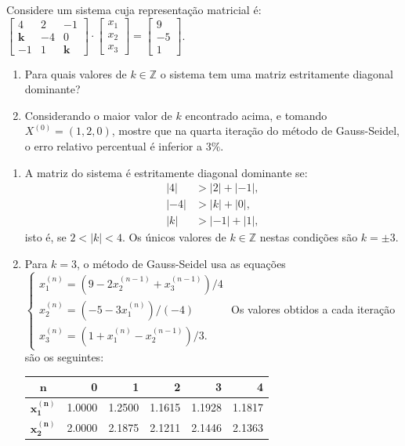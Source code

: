 \documentclass[12pt,a4paper]{article}
\begin{document}
\begin{ExerciseList}
\Exercise[title={2,5}]
Considere um sistema cuja representação matricial é:
$
\begin{bmatrix}
 4 &  2 & -1 \\
\mathbf{k} & -4 &  0 \\
-1 &  1 &  \mathbf{k}
\end{bmatrix}
\cdot
\begin{bmatrix}
x_1 \\ x_2 \\ x_3
\end{bmatrix}
=
\begin{bmatrix}
9 \\ -5 \\ 1
\end{bmatrix}
$.
\begin{enumerate}
\item Para quais valores de $k \in \mathbb{Z}$ o sistema tem uma matriz estritamente diagonal dominante?
\item Considerando o maior valor de $k$ encontrado acima, e tomando$X^{(0)} = (1, 2, 0)$, mostre que na quarta iteração do método de Gauss-Seidel, o erro relativo percentual é inferior a $3\%$.
\end{enumerate}
\Answer
\begin{enumerate}
\item  A matriz do sistema é estritamente diagonal dominante se:
\begin{align*}
|4|  & > |2|  + |-1|,\\
|-4| & > |k|  + |0|,\\
|k|  & > |-1| + |1|,
\end{align*}
isto é, se $2 < |k| < 4$. Os únicos valores de $k \in \mathbb{Z}$ nestas condições são $k = \pm 3$.
\item Para $k=3$, o método de Gauss-Seidel usa as equações $
\begin{cases}
x_1^{(n)} = ( 9 - 2x_2^{(n-1)} + x_3^{(n-1)})/4\\
x_2^{(n)} = (-5 - 3x_1^{(n)})/(-4)\\
x_3^{(n)} = ( 1 +  x_1^{(n)} - x_2^{(n-1)})/3.
\end{cases}
$
Os valores obtidos a cada iteração são os seguintes:
\begin{center}
\begin{tabular}{|c|r|r|r|r|r|}
\hline
$\mathbf{n}$     & 0 & 1 & 2 & 3 & 4 \\
\hline
$\mathbf{x_1^{(n)}}$ & 1.0000 & 1.2500 & 1.1615 & 1.1928 & 1.1817 \\
\hline
$\mathbf{x_2^{(n)}}$ & 2.0000 & 2.1875 & 2.1211 & 2.1446 & 2.1363 \\

\end{tabular}
\end{center}
\end{enumerate}
\end{ExerciseList}
\end{document}
